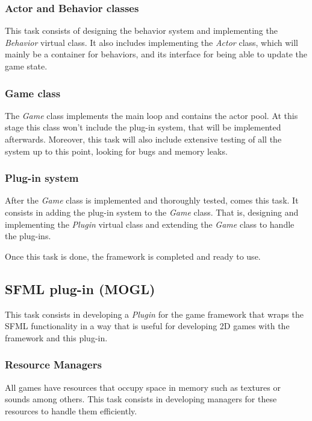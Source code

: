 \subsubsection{Actor and Behavior classes}

This task consists of designing the behavior system and implementing the \textit{Behavior} 
virtual class. It also includes implementing the \textit{Actor} class, which will 
mainly be a container for behaviors, and its interface for being able to update the 
game state.


\subsubsection{Game class}

The \textit{Game} class implements the main loop and contains the actor pool. At this stage 
this class won't include the plug-in system, that will be implemented afterwards. 
Moreover, this task will also include extensive testing of all the system up to this 
point, looking for bugs and memory leaks.

\subsubsection{Plug-in system}

After the \textit{Game} class is implemented and thoroughly tested, comes this task. 
It consists in adding the plug-in system to the \textit{Game} class. That is, designing 
and implementing the \textit{Plugin} virtual class and extending the \textit{Game} 
class to handle the plug-ins.

Once this task is done, the framework is completed and ready to use.

\subsection{SFML plug-in (MOGL)}

This task consists in developing a \textit{Plugin} for the game framework that wraps 
the SFML functionality in a way that is useful for developing 2D games with the framework 
and this plug-in.

\subsubsection{Resource Managers}

All games have resources that occupy space in memory such as textures or sounds among 
others. This task consists in developing managers for these resources to handle them 
efficiently.

